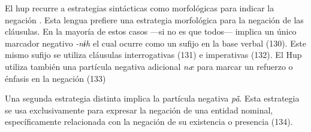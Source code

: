 El hup recurre a estrategias sintácticas como morfológicas para indicar la negación \textcolor{MidnightBlue}{\citep{hup}}. Esta lengua prefiere una estrategia morfológica para la negación de las cláusulas. En la mayoría de estos casos —si no es que todos— implica un único marcador negativo {\setmainfont{Charis SIL} \textit{-nɨh}} el cual ocurre como un sufijo en la base verbal (130). Este mismo sufijo se utiliza cláusulas interrogativas (131) e imperativas (132). El  Hup  utiliza  también una partícula  negativa  adicional {\setmainfont{Charis SIL} \textit{næ}} para  marcar  un refuerzo o énfasis en la negación (133)


Una segunda estrategia distinta implica la partícula negativa {\setmainfont{Charis SIL} \textit{pā̌}}. Esta estrategia se usa exclusivamente para expresar la negación de una entidad nominal, específicamente relacionada con la negación de su existencia o presencia (134).